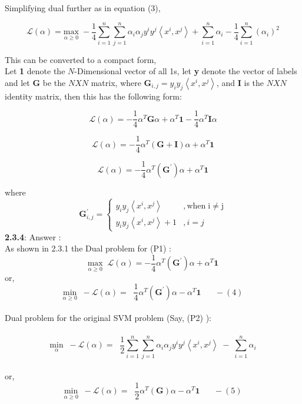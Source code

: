 \documentclass[a4paper,11pt]{article}
\begin{document}
\begin{mlsolution}
Simplifying dual further as in equation (3),

\[
  \mathcal{L}\left ( \alpha \right ) = \underset{\alpha\geq 0}{\text{max}} \; -\frac{1}{4}\sum_{i=1}^{n}\sum_{j=1}^{n}\alpha_{i}\alpha_{j}y^{i}y^{j}\left \langle x^{i}, x^{j} \right \rangle + \sum_{i=1}^{n}\alpha_{i} - \frac{1}{4}\sum_{i=1}^{n} \left ( \alpha_{i} \right )^{2}
\]

This can be converted to a compact form,\\
Let \textbf{1} denote the $N$-Dimensional vector of all 1s, let \textbf{y} denote the vector of labels and let \textbf{G} be the $NXN$ matrix, where $\textbf{G}_{i,j} = y_{i}y_{j}\left \langle x^{i}, x^{j} \right \rangle$, and \textbf{I} is the $NXN$ identity matrix, then this has the following form:

\[
\mathcal{L}\left ( \alpha \right ) =  - \frac{1}{4} \alpha^{T}\textbf{G}\alpha + \alpha^{T}\textbf{1}  - \frac{1}{4} \alpha^{T}\textbf{I}\alpha 
\]

\[
\mathcal{L}\left ( \alpha \right ) =  - \frac{1}{4} \alpha^{T}(\textbf{G} + \textbf{I})\alpha + \alpha^{T}\textbf{1}
\]

\[
\mathcal{L}\left ( \alpha \right ) =  - \frac{1}{4} \alpha^{T}(\textbf{G}^{'})\alpha + \alpha^{T}\textbf{1}
\]

where \[\textbf{G}^{'}_{i,j} = \left\{\begin{matrix}
y_{i}y_{j}\left \langle x^{i}, x^{j} \right \rangle & , \text{when} \; \text{i} \neq \text{j}\\ 
y_{i}y_{j}\left \langle x^{i}, x^{j} \right \rangle + 1 & , i = j
\end{matrix}\right.\]
\newpage
\textbf{2.3.4}: Answer :\\

As shown in 2.3.1 the Dual problem for (P1) :
\[
\underset{\alpha\geq 0}{\text{max}} \;\;\mathcal{L}\left ( \alpha \right ) =  - \frac{1}{4} \alpha^{T}(\textbf{G}^{'})\alpha + \alpha^{T}\textbf{1}
\]
or,\\
\[
\underset{\alpha\geq 0}{\text{min}} \;\; - \mathcal{L}\left ( \alpha \right ) = \; \;\frac{1}{4} \alpha^{T}(\textbf{G}^{'})\alpha - \alpha^{T}\textbf{1} \;\;\;\;\;\;-(4)
\]\\

Dual problem for the original SVM problem (Say, (P2) ):\\\\
\[
\underset{\alpha}{\text{min}} \;\; - \mathcal{L}\left ( \alpha \right ) = \; \;\frac{1}{2}\sum_{i=1}^{n}\sum_{j=1}^{n}\alpha_{i}\alpha_{j}y^{i}y^{j}\left \langle x^{i}, x^{j} \right \rangle \;-\; \sum_{i=1}^{n}\alpha_{i}
\]\\
or,\\
\[
\underset{\alpha\geq 0}{\text{min}} \;\; - \mathcal{L}\left ( \alpha \right ) = \; \;\frac{1}{2} \alpha^{T}(\textbf{G})\alpha - \alpha^{T}\textbf{1} \;\;\;\;\;\;-(5)
\]\\


\end{mlsolution}
\end{document}
